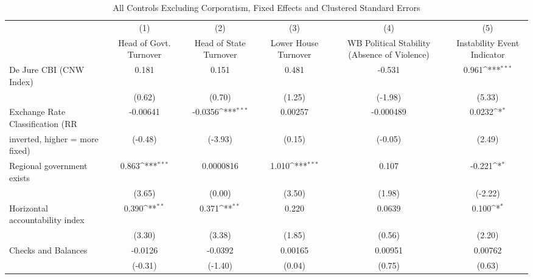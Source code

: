 \begin{table}[htbp]\centering
\def\sym#1{\ifmmode^{#1}\else\(^{#1}\)\fi}
\caption{All Controls Excluding Corporatism, Fixed Effects and Clustered Standard Errors \label{nccmultIndFEDJ}}
\begin{tabular}{l*{5}{c}}
\toprule
                                        &\multicolumn{1}{c}{(1)}&\multicolumn{1}{c}{(2)}&\multicolumn{1}{c}{(3)}&\multicolumn{1}{c}{(4)}&\multicolumn{1}{c}{(5)}\\
                                        &\multicolumn{1}{c}{Head of Govt. Turnover}&\multicolumn{1}{c}{Head of State Turnover}&\multicolumn{1}{c}{Lower House Turnover}&\multicolumn{1}{c}{WB Political Stability (Absence of Violence)}&\multicolumn{1}{c}{Instability Event Indicator}\\
\midrule
De Jure CBI (CNW Index)                 &    0.181         &    0.151         &    0.481         &   -0.531         &    0.961\sym{***}\\
                                        &   (0.62)         &   (0.70)         &   (1.25)         &  (-1.98)         &   (5.33)         \\
\addlinespace
Exchange Rate Classification (RR        & -0.00641         &  -0.0356\sym{***}&  0.00257         &-0.000489         &   0.0232\sym{*}  \\
inverted, higher = more fixed)          &  (-0.48)         &  (-3.93)         &   (0.15)         &  (-0.05)         &   (2.49)         \\
\addlinespace
Regional government exists              &    0.863\sym{***}&0.0000816         &    1.010\sym{***}&    0.107         &   -0.221\sym{*}  \\
                                        &   (3.65)         &   (0.00)         &   (3.50)         &   (1.98)         &  (-2.22)         \\
\addlinespace
Horizontal accountability index         &    0.390\sym{**} &    0.371\sym{**} &    0.220         &   0.0639         &    0.100\sym{*}  \\
                                        &   (3.30)         &   (3.38)         &   (1.85)         &   (0.56)         &   (2.20)         \\
\addlinespace
Checks and Balances                     &  -0.0126         &  -0.0392         &  0.00165         &  0.00951         &  0.00762         \\
                                        &  (-0.31)         &  (-1.40)         &   (0.04)         &   (0.75)         &   (0.63)         \\

\end{tabular}
\end{table}
